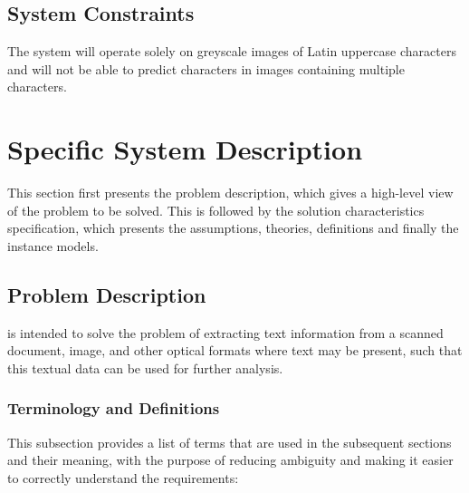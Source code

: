 \documentclass[12pt]{article}
\begin{document}
\subsection{System Constraints}

The system will operate solely on greyscale images of Latin uppercase characters
and will not be able to predict characters in images containing multiple
characters.

\section{Specific System Description}

This section first presents the problem description, which gives a high-level
view of the problem to be solved.  This is followed by the solution
characteristics specification, which presents the assumptions, theories,
definitions and finally the instance models.


\subsection{Problem Description} \label{Sec_pd}

\progname{} is intended to solve the problem of extracting text information from
a scanned document, image, and other optical formats where text may be present,
such that this textual data can be used for further analysis.

\subsubsection{Terminology and  Definitions}


This subsection provides a list of terms that are used in the subsequent
sections and their meaning, with the purpose of reducing ambiguity and making it
easier to correctly understand the requirements:
\end{document}
